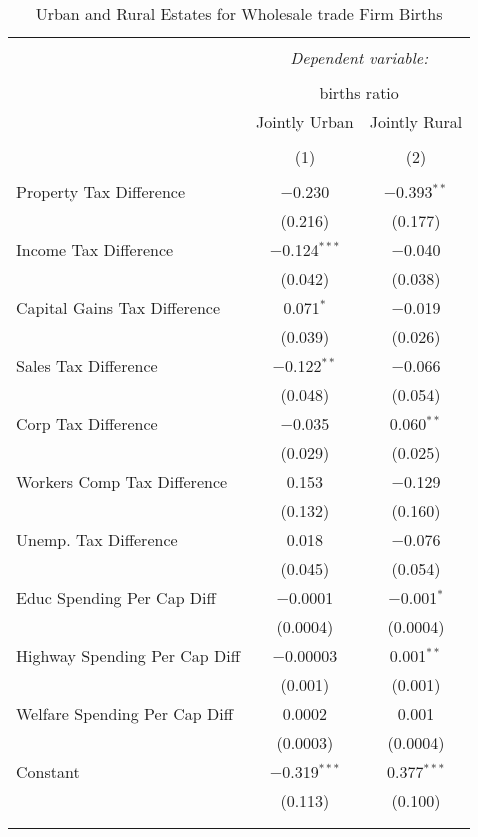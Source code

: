 
\begin{table}[!htbp] \centering 
  \caption{Urban and Rural Estates for  Wholesale trade Firm Births} 
  \label{} 
\begin{tabular}{@{\extracolsep{5pt}}lcc} 
\\[-1.8ex]\hline 
\hline \\[-1.8ex] 
 & \multicolumn{2}{c}{\textit{Dependent variable:}} \\ 
\cline{2-3} 
\\[-1.8ex] & \multicolumn{2}{c}{births ratio} \\ 
 & Jointly Urban & Jointly Rural \\ 
\\[-1.8ex] & (1) & (2)\\ 
\hline \\[-1.8ex] 
 Property Tax Difference & $-$0.230 & $-$0.393$^{**}$ \\ 
  & (0.216) & (0.177) \\ 
  Income Tax Difference & $-$0.124$^{***}$ & $-$0.040 \\ 
  & (0.042) & (0.038) \\ 
  Capital Gains Tax Difference & 0.071$^{*}$ & $-$0.019 \\ 
  & (0.039) & (0.026) \\ 
  Sales Tax Difference & $-$0.122$^{**}$ & $-$0.066 \\ 
  & (0.048) & (0.054) \\ 
  Corp Tax Difference & $-$0.035 & 0.060$^{**}$ \\ 
  & (0.029) & (0.025) \\ 
  Workers Comp Tax Difference & 0.153 & $-$0.129 \\ 
  & (0.132) & (0.160) \\ 
  Unemp. Tax Difference & 0.018 & $-$0.076 \\ 
  & (0.045) & (0.054) \\ 
  Educ Spending Per Cap Diff & $-$0.0001 & $-$0.001$^{*}$ \\ 
  & (0.0004) & (0.0004) \\ 
  Highway Spending Per Cap Diff & $-$0.00003 & 0.001$^{**}$ \\ 
  & (0.001) & (0.001) \\ 
  Welfare Spending Per Cap Diff & 0.0002 & 0.001 \\ 
  & (0.0003) & (0.0004) \\ 
  Constant & $-$0.319$^{***}$ & 0.377$^{***}$ \\ 
  & (0.113) & (0.100) \\ 
 \hline \\[-1.8ex] 
\hline 
\hline \\[-1.8ex] 
\end{tabular} 
\end{table} 
